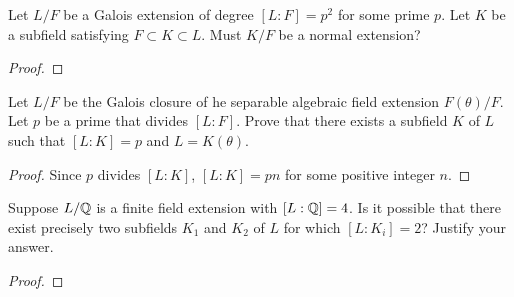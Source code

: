 \begin{problem}
Let $L/F$ be a Galois extension of degree $[L:F]=p^2$ for some prime
$p$. Let $K$ be a subfield satisfying $F\subset K\subset L$. Must $K/F$ be
a normal extension?
\begin{proof}
\end{proof}
\end{problem}

\begin{problem}
Let $L/F$ be the Galois closure of he separable algebraic field extension
$F(\theta)/F$. Let $p$ be a prime that divides $[L:F]$. Prove that there
exists a subfield $K$ of $L$ such that $[L:K]=p$ and $L=K(\theta)$.
\end{problem}
\begin{proof}
Since $p$ divides $[L:K]$, $[L:K]=pn$ for some positive integer
$n$.
\end{proof}
\begin{problem}
Suppose $L/\mathbb{Q}$ is a finite field extension with $[L:\mathbb{Q}]=4$. Is it
possible that there exist precisely two subfields $K_1$ and $K_2$ of $L$
for which $[L:K_i]=2$? Justify your answer.
\begin{proof}
\end{proof}
\end{problem}

